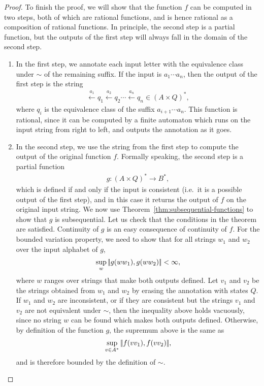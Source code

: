 \begin{proof}
To finish the proof, we will show that the function $f$ can be computed in two steps, both of which are rational functions, and is hence rational as a composition of rational functions. In principle, the second step is a partial function, but the outputs of the first step will always fall in the domain of the second step.

\begin{enumerate}
    \item In the first step, we annotate each input letter with the equivalence class under $\sim$ of the remaining suffix. If the input is $a_1 \cdots a_n$, then the output of the first step is the string
\begin{align*}
\xleftarrow{a_1} q_1 \xleftarrow{a_2} q_2 \cdots \xleftarrow{a_n} q_n \in (A \times Q)^*,
\end{align*}
where $q_i$ is the equivalence class of the suffix $a_{i+1} \cdots a_n$. This function is rational, since it can be computed by a finite automaton which runs on the input string from right to left, and outputs the annotation as it goes.
    \item In the second step, we use the string from the first step to compute the output of the original function $f$. Formally speaking, the second step is a partial function 
    \begin{align*}
     g : (A \times Q)^* \to B^*,
    \end{align*}
    which is defined if and only if the input is consistent (i.e.~it is a possible output of the first step), and in this case it returns the output of $f$ on the original input string. We now use Theorem~\ref{thm:subsequential-functions} to show that $g$ is subsequential. Let us check that the conditions in the theorem are satisfied. Continuity of $g$ is an easy consequence of continuity of $f$. For the bounded variation property,  we need to show that  for all strings $w_1$ and $w_2$ over the input alphabet of $g$,
    \begin{align*}
    \sup_{w} |\!| g(ww_1), g(ww_2) |\!| < \infty,
    \end{align*}
    where $w$ ranges over strings that make both outputs defined.
    Let $v_1$ and $v_2$ be the strings obtained from $w_1$ and $w_2$ by erasing the annotation with states $Q$. If $w_1$ and $w_2$ are inconsistent, or if they are consistent but the strings $v_1$ and $v_2$ are not equivalent under $\sim$, then the inequality above holds vacuously, since no string $w$ can be found which makes both outputs defined. Otherwise, by definition of the function $g$, the supremum above is the same as 
    \begin{align*}
    \sup_{v \in A^*} |\!| f(vv_1), f(vv_2) |\!|,
    \end{align*}
    and is therefore bounded by the definition of $\sim$.
\end{enumerate}

\end{proof}

